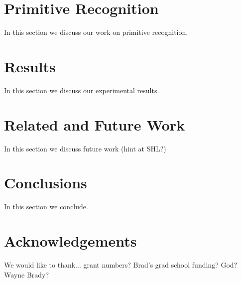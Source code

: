 \documentclass[letterpaper]{article}
\begin{document}
\section{Primitive Recognition}
\label{sec:recognition}
In this section we discuss our work on primitive recognition.

\section{Results}
\label{sec:result}
In this section we discuss our experimental results.

\section{Related and Future Work}
\label{sec:future}
In this section we discuss future work (hint at SHL?)

\section{Conclusions}
\label{sec:conclusions}
In this section we conclude.

\section{Acknowledgements}
\label{sec:acknowledgements}
We would like to thank... grant numbers?  Brad's grad school funding?  God?
Wayne Brady?



\end{document}
